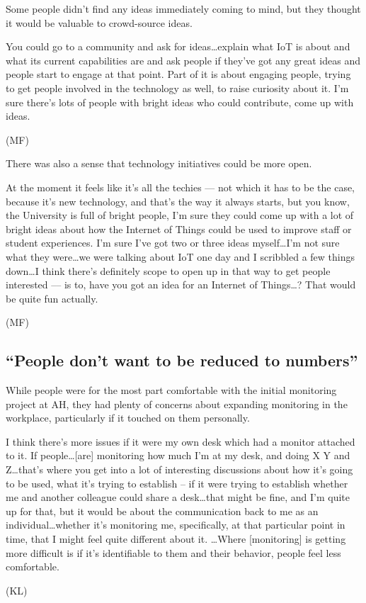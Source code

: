 Some people didn’t find any ideas immediately coming to mind, but they
thought it would be valuable to crowd-source ideas.

\begin{qt}You could go to a community and ask for ideas\ldots explain what IoT is
about and what its current capabilities are and ask people if they’ve
got any great ideas and people start to engage at that point. Part of
it is about engaging people, trying to get people involved in the
technology as well, to raise curiosity about it. I’m sure there’s lots
of people with bright ideas who could contribute, come up with ideas.
\end{qt}
(MF) 

There was also a sense that technology initiatives could be more open.

\begin{qt}At the moment it feels like it’s all the techies --- not which it has
to be the case, because it’s new technology, and that’s the way it
always starts, but you know, the University is full of bright people,
I’m sure they could come up with a lot of bright ideas about how the
Internet of Things could be used to improve staff or student
experiences. I’m sure I’ve got two or three ideas myself\ldots I’m not sure what
they were\ldots we were talking about IoT one day and I scribbled a few
things down\ldots I think there’s definitely scope to open up in that way to
get people interested --– is to, have you got an idea for an Internet of
Things\ldots ? That would be quite fun actually.
\end{qt}
(MF) 

\subsection{``People don’t want to be reduced to numbers”}
\label{sec:people-dont-want}


While people were for the most part comfortable with the initial
monitoring project at AH, they had plenty of concerns about expanding
monitoring in the workplace, particularly if it touched on them
personally.

\begin{qt}I think there’s more issues if it were my own desk which had a
monitor attached to it. If people\ldots [are] monitoring how much I’m at my
desk, and doing X Y and Z\ldots that’s where you get into a lot of
interesting discussions about how it’s going to be used, what it’s
trying to establish – if it were trying to establish whether me and
another colleague could share a desk\ldots that might be fine, and I’m quite
up for that, but it would be about the communication back to me as an
individual\ldots whether it’s monitoring me, specifically, at that
particular point in time, that I might feel quite different about it.
\ldots Where [monitoring] is getting more difficult is if it’s
identifiable to them and their behavior, people feel less
comfortable.
\end{qt}
(KL)

